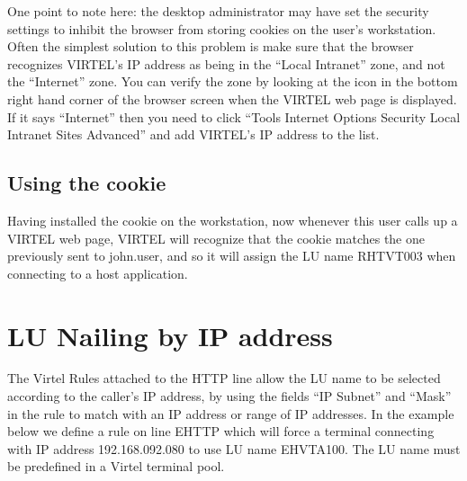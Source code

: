 \documentclass[letterpaper,10pt,english]{sphinxmanual}
\begin{document}
\sphinxAtStartPar
One point to note here: the desktop administrator may have set the security settings to inhibit the browser from storing cookies on the user’s workstation.  Often the simplest solution to this problem is make sure that the browser recognizes VIRTEL’s IP address as being in the “Local Intranet” zone, and not the “Internet” zone.  You can verify the zone by looking at the icon in the bottom right hand corner of the browser screen when the VIRTEL web page is displayed.  If it says “Internet” then you need to click “Tools \sphinxhyphen{} Internet Options \sphinxhyphen{} Security \sphinxhyphen{} Local Intranet \sphinxhyphen{} Sites \textendash{} Advanced” and add VIRTEL’s IP address to the list.


\subsection{Using the cookie}
\label{\detokenize{connectivity_guide:using-the-cookie}}
\sphinxAtStartPar
Having installed the cookie on the workstation, now whenever this user calls up a VIRTEL web page, VIRTEL will recognize that the cookie matches the one previously sent to john.user, and so it will assign the LU name RHTVT003 when connecting to a host application.

\newpage

\ignorespaces 

\section{LU Nailing by IP address}
\label{\detokenize{connectivity_guide:lu-nailing-by-ip-address}}\label{\detokenize{connectivity_guide:index-157}}
\sphinxAtStartPar
The Virtel Rules attached to the HTTP line allow the LU name to be selected according to the caller’s IP address, by using the fields “IP Subnet” and “Mask” in the rule to match with an IP address or range of IP addresses. In the example below we define a rule on line E\sphinxhyphen{}HTTP which will force a terminal connecting with IP address 192.168.092.080 to use LU name EHVTA100. The LU name must be pre\sphinxhyphen{}defined in a Virtel terminal pool.

\sphinxAtStartPar
{}
\end{document}

